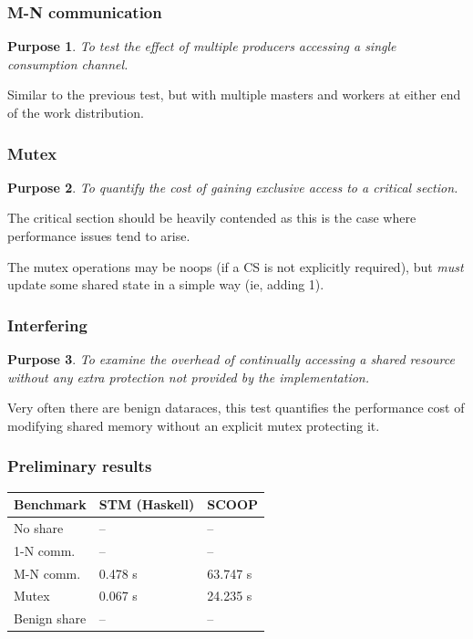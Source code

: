\documentclass{beamer}
\newtheorem{purpose}{Purpose}
\begin{document}
\begin{frame}
  \frametitle{M-N communication}
  \begin{purpose}
    To test the effect of multiple producers accessing a single consumption channel.
  \end{purpose}

  Similar to the previous test, but with multiple masters and workers at either end
  of the work distribution.
\end{frame}

\begin{frame}
  \frametitle{Mutex}
  \begin{purpose}
    To quantify the cost of gaining exclusive access to a critical section.
  \end{purpose}

  The critical section should be heavily contended as this is the case where
  performance issues tend to arise.

  The mutex operations may be noops (if a CS is not explicitly required),
  but \emph{must} update some shared state in a simple way (ie, adding 1).
\end{frame}

\begin{frame}
  \frametitle{Interfering}
  \begin{purpose}
    To examine the overhead of continually accessing a shared resource without
    any extra protection not provided by the implementation.
  \end{purpose}

  Very often there are benign dataraces, this test quantifies the performance
  cost of modifying shared memory without an explicit mutex protecting it.
\end{frame}

\begin{frame}
  \frametitle{Preliminary results}

  \begin{center}
    \begin{tabular}[h]{l|l|l}
      Benchmark    & STM (Haskell) & SCOOP \\ \hline
      No share     &     --        &--     \\
      1-N comm.    &       --      &  --   \\
      M-N comm.    & 0.478 s       & 63.747 s \\
      Mutex        & 0.067 s       & 24.235 s \\
      Benign share &        --     &   --  \\
    \end{tabular}
  \end{center}
\end{frame}
\end{document}
